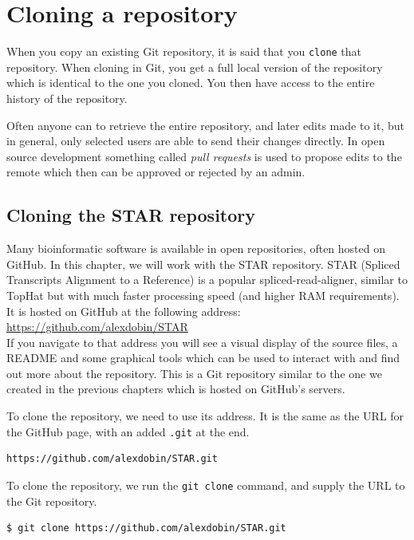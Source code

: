 \documentclass[../main/git_course_main.tex]{subfiles}
\begin{document}
\section{Cloning a repository}

When you copy an existing Git repository, it is said that you \verb$clone$ that repository. 
When cloning in Git, you get a full local version of the repository which is identical
to the one you cloned. You then have access to the entire history of the repository.

Often anyone can to retrieve the entire repository, and later edits made to it,
but in general, only selected users are able to send their changes directly. In open source development something called \textit{pull requests} is used to propose edits to the remote which then can be approved or rejected by an admin.

\subsection{Cloning the STAR repository}

Many bioinformatic software is available in open repositories, often hosted on GitHub. In this chapter, we will work with the STAR repository. STAR (Spliced Transcripts Alignment to a Reference) is a popular spliced-read-aligner, similar to TopHat but with much faster processing speed (and higher RAM requirements). It is hosted on GitHub at the following address: \\

\url{https://github.com/alexdobin/STAR} \\

If you navigate to that address you will see a visual display of the source files, a README and some graphical tools which can be used to interact with and find out more about the repository. This is a Git repository similar to the one we created in the previous chapters which is hosted on GitHub's servers.

To clone the repository, we need to use its address. It is the same as the URL for the GitHub page, with an added \verb$.git$ at the end.

\begin{verbatim}
https://github.com/alexdobin/STAR.git
\end{verbatim}

To clone the repository, we run the \verb$git clone$ command, and supply the URL to the Git repository.

\begin{codebox}
\begin{lstlisting}
$ git clone https://github.com/alexdobin/STAR.git
\end{lstlisting}
\end{codebox}
\end{document}
